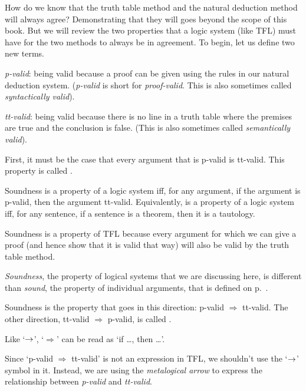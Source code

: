 How do we know that the truth table method and the natural deduction method will always agree? Demonstrating that they will goes beyond the scope of this book. But we will review the two properties that a logic system (like TFL) must have for the two methods to always be in agreement.  To begin, let us define two new terms. 
\begin{earg}
\item[] \textit{p-valid}: being valid because a proof can be given using the rules in our natural deduction system. (\textit{p-valid} is short for \textit{proof-valid}. This is also sometimes called \textit{syntactically valid}). 
\item[] \textit{tt-valid}: being valid because there is no line in a truth table where the premises are true and the conclusion is false. (This is also sometimes called \textit{semantically valid}).
\end{earg}
First, it must be the case that every argument that is p-valid is tt-valid. This property is called .

\begin{factboxy}{Soundness}\label{def:Soundness}
 is a property of a logic system iff, for any argument, if the argument is p-valid, then the argument tt-valid.
\tcblower
Equivalently,  is a property of a logic system iff, for any sentence, if a sentence is a theorem, then it is a tautology. 
\end{factboxy}

\noindent Soundness is a property of TFL because every argument for which we can give a proof (and hence show that it is valid that way) will also be valid by the truth table method.


\begin{notebox}
\textit{Soundness}, the property of logical systems that we are discussing here, is different than \textit{sound}, the property of individual arguments, that is defined on p.~\pageref{def-sound-arg}.
\end{notebox}

Soundness is the property that goes in this direction: p-valid $\Rightarrow$ tt-valid. The other direction, tt-valid $\Rightarrow$ p-valid, is called .

\begin{notebox}
Like `$\rightarrow$', `$\Rightarrow$' can be read as `if \ldots, then \ldots'. 
\smallskip

Since `p-valid $\Rightarrow$ tt-valid' is not an expression in TFL, we shouldn't use the `$\rightarrow$' symbol in it. Instead, we are using the \textit{metalogical arrow} to express the relationship between \textit{p-valid} and \textit{tt-valid}.
\end{notebox}

